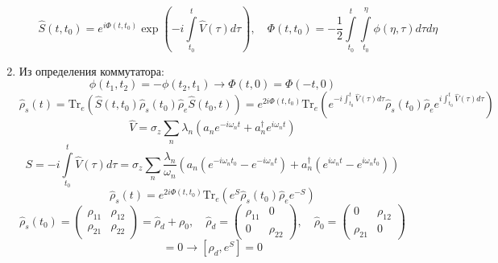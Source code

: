 \documentclass[12pt]{article}
\theoremstyle{definition}
\begin{document}
\begin{enumerate}
\begin{enumerate}
\begin{equation}
            \boxed{\hat{S}(t,t_0) = e^{i\Phi(t,t_0)}\exp\left(-i\int\limits_{t_0}^t\hat{V}(\tau)d\tau\right),\quad\Phi(t,t_0)=-\frac{1}{2}\int\limits_{t_0}^t\int\limits_{t_0}^\eta\phi(\eta,\tau)d\tau d\eta}
        \end{equation}
    \end{enumerate}
    \item Из определения коммутатора:
    \begin{equation}
        \phi(t_1,t_2)=-\phi(t_2,t_1)\rightarrow\Phi(t,0)=\Phi(-t,0)
    \end{equation}
    \begin{equation}
        \hat{\rho}_s(t)=\text{Tr}_e(\hat{S}(t,t_0)\hat{\rho}_s(t_0)\hat{\rho}_e\hat{S}(t_0,t))=e^{2i\Phi(t,t_0)}\text{Tr}_e(e^{-i\int_{t_0}^t\hat{V}(\tau)d\tau}\hat{\rho}_s(t_0)\hat{\rho}_ee^{i\int_{t_0}^t\hat{V}(\tau)d\tau})
    \end{equation}
    \begin{equation}
        \hat{V}=\hat{\sigma}_z\sum\limits_n\lambda_n(a_ne^{-i\omega_nt}+a^\dagger_ne^{i\omega_nt})
    \end{equation}
    \begin{equation}
        S=-i\int\limits_{t_0}^t\hat{V}(\tau)d\tau=\hat{\sigma}_z\sum\limits_n\frac{\lambda_n}{\omega_n}(a_n(e^{-i\omega_nt_0}-e^{-i\omega_nt})+a^\dagger_n(e^{i\omega_nt}-e^{i\omega_nt_0}))
    \end{equation}
    \begin{equation}
        \hat{\rho}_s(t)=e^{2i\Phi(t,t_0)}\text{Tr}_e(e^S\hat{\rho}_s(t_0)\hat{\rho}_ee^{-S})
    \end{equation}
    \begin{equation}
        \hat{\rho}_s(t_0)=\begin{pmatrix}
        \rho_{11} & \rho_{12}\\
        \rho_{21} & \rho_{22}
        \end{pmatrix}=\hat{\rho}_d+\rho_0,\quad \hat{\rho}_d=\begin{pmatrix}
        \rho_{11} & 0\\
        0 & \rho_{22}
        \end{pmatrix},\quad\hat{\rho}_0=\begin{pmatrix}
        0 & \rho_{12}\\
        \rho_{21} & 0
        \end{pmatrix}
    \end{equation}
    \begin{equation}
        [\rho_d,\sigma_z]=0\rightarrow[\rho_d,e^S]=0

\end{equation}
\end{enumerate}
\end{document}

